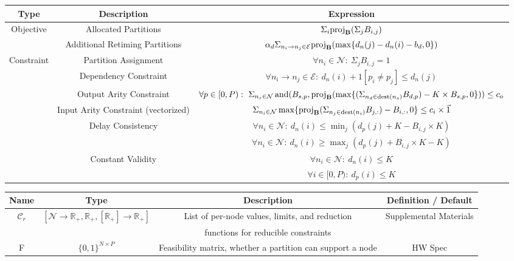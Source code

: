 \begin{table*}
	\begin{tabular}{c | c | c}
		\textbf{Type} & \textbf{Description} & \textbf{Expression}\\\hline
		Objective & Allocated Partitions & $\Sigma_i \text{proj}_\mathbf{B}(\Sigma_j B_{i, j})$\\
		& Additional Retiming Partitions & $\alpha_d \Sigma_{n_i \to n_j \in \mathcal{E}} \text{proj}_\mathbf{B}(\max\{d_n(j) - d_n(i) - b_d, 0\})$\\
		\hline
		Constraint & Partition Assignment & $ \forall n_i \in \mathcal{N}:\ \Sigma_j B_{i, j} = 1$\\
		&Dependency Constraint & $\forall n_i \to n_j \in \mathcal{E}:\ d_n(i) + 1[p_i \ne p_j] \le d_n(j)$\\
		&Output Arity Constraint & $\forall p \in [0, P):\ 	\Sigma_{n_s \in \mathcal{N}} \operatorname*{and}(B_{s, p}, \text{proj}_\mathbf{B}(\max\{(\Sigma_{n_d \in \operatorname*{dest}(n_s)} B_{d, p}) - K \times B_{s, p}, 0\})) \le c_o$\\
		&Input Arity Constraint (vectorized) & $\Sigma_{n_i \in \mathcal{N}} \max\{\text{proj}_\mathbf{B}(\Sigma_{n_j \in \operatorname*{dest}(n_i)} B_{j, :}) - B_{i, :}, 0\} \le c_i \times \vec{1}$\\
		&Delay Consistency& $\forall n_i \in \mathcal{N}:\ d_n(i) \le \min_j (d_p(j) + K - B_{i, j} \times K)$ \\
		&& $\forall n_i \in \mathcal{N}:\ d_n(i) \ge \max_j (d_p(j) + B_{i, j} \times K - K)$\\
		&Constant Validity& $\forall n_i \in \mathcal{N}:\ d_n(i) \le K$\\
		&& $\forall i \in [0, P):\ d_p(i) \le K$
	\end{tabular}
  \caption{Solver formulation for partitioning*.}
	\label{tab:solver-eqns}

	\begin{tabular}{c | c | c | c}
		\textbf{Name} & \textbf{Type} & \textbf{Description} & \textbf{Definition / Default}\\\hline
		$\mathcal{C}_r$& $[\mathcal{N} \to \mathbb{R}_+,\mathbb{R}_+, [\mathbb{R}_+] \to \mathbb{R}_+]$ & List of per-node values, limits, and reduction& Supplemental Materials\\&& functions for reducible constraints& \\
		F & $\{0, 1\}^{N \times P}$ & Feasibility matrix, whether a partition can support a node& HW Spec \\ 
	\end{tabular}
	\caption{ extension for solver-based merging, which is a generalization of the partitioning problem.}
	\label{tab:merging-variables}


\end{table*}
